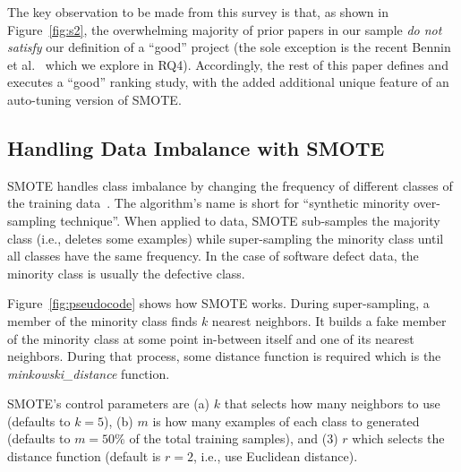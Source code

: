 \documentclass[sigconf]{acmart}
\theoremstyle{break}
\newcommand{\sma}{{\sc SMOTE}}
\begin{document}
The key observation to be made from  this 
survey is that, as shown in Figure~\ref{fig:s2}, the overwhelming majority of
prior papers in our sample {\em do not satisfy}  our definition of a ``good'' project
(the sole exception is the  recent   Bennin et al.~\cite{bennin2017mahakil} which we explore in RQ4).
Accordingly, the rest of this
paper defines and executes a ``good'' ranking  study, with the added additional
unique feature of   an auto-tuning version of {\sma}.

\subsection{Handling Data Imbalance with SMOTE}
\label{sect:smote}

{\sma} handles class imbalance by changing the frequency of different classes of the training
data~\cite{chawla2002smote}. 
The algorithm's name is short for ``synthetic minority over-sampling technique''.
When applied to data, {\sma} sub-samples the majority class (i.e., deletes some examples)
while super-sampling the minority class
until
all classes have the same frequency.  In the case of software defect data,
the minority class is usually the  defective class.

Figure~\ref{fig:pseudocode} shows how {\sma} works. During super-sampling,
a member of the minority class finds $k$ nearest neighbors. It builds a fake member
of the minority class at some point in-between itself and one of its nearest
neighbors.  During that process, some distance function is required which is the {\em minkowski\_distance} function. 

{\sma}'s control parameters are (a) $k$ that selects how many neighbors to use  (defaults to $k=5$), (b) $m$ is how many examples of each class to generated (defaults to $m=50\%$ of the total training samples), and (3) $r$ which selects  the distance function (default is $r=2$,
i.e., use    
  Euclidean distance).

\end{document}
